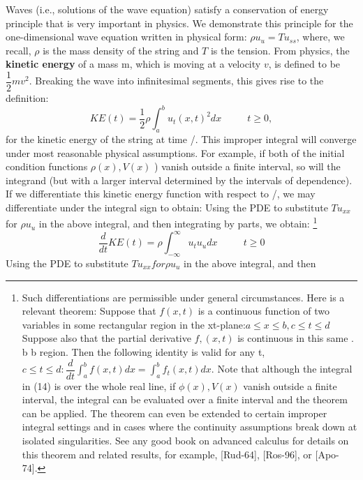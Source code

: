\documentclass[../main.tex]{subfiles}
\begin{document}
Waves (i.e., solutions of the wave equation) satisfy a conservation of energy 
principle that is very important in physics. We demonstrate this principle for the 
one-dimensional wave equation written in physical form: $\rho u_u = Tu_{ss}$, where, we recall, $ \rho $ is the mass density of the string and $T$ is the tension. From physics, the 
\textbf{kinetic energy} of a mass m, which is moving at a velocity $v$, is defined to be $\dfrac{1}{2}mv^2$. Breaking the wave into infinitesimal segments, this gives rise to the 
definition: 
\begin{equation} \label{eqa14}
KE(t)=\dfrac{1}{2} \rho \int_a^b u_t (x,t)^2 dx ~~~~~~~~~~~~ t\geq 0, 
\end{equation}
for the kinetic energy of the string at time /. This improper integral will converge 
under most reasonable physical assumptions. For example, if both of the initial 
condition functions  $ \rho (x), V(x)$ ) vanish outside a finite interval, so will the 
integrand (but with a larger interval determined by the intervals of dependence). If we differentiate this kinetic energy function with respect to /, we may differentiate 
under the integral sign to obtain: 
Using the PDE to substitute $ Tu_{xx}$for $\rho u_u$ in the above integral, and then 
integrating by parts, we obtain: 
\footnote{ Such differentiations are permissible under general circumstances. Here is a relevant theorem: 
Suppose that $f(x,t)$ is a continuous function of two variables in some rectangular region in the xt-plane:$a\leqslant x\leqslant b, c\leqslant t \leqslant d$ Suppose also that the partial derivative $f,(x,t)$ is continuous in this same 
. b b region. Then the following identity is valid for any t, $c\leqslant t \leqslant d : \dfrac{d}{dt} \int_{a}^{b} f(x,t)dx=\int_{a}^{b} f_t (x,t) dx$. Note that 
although the integral in (14) is over the whole real line, if $\phi(x), V(x)$ vanish outside a finite interval, 
the integral can be evaluated over a finite interval and the theorem can be applied. The theorem can 
even be extended to certain improper integral settings and in cases where the continuity assumptions 
break down at isolated singularities. See any good book on advanced calculus for details on this 
theorem and related results, for example, [Rud-64], [Ros-96], or [Apo-74]. } 
\begin{equation}\label{eqa15}
\frac{d}{dt} KE(t)=\rho \int_{-\infty}^{\infty} u_t u_u dx ~~~~~~~~~~~~ t\geq 0
\end{equation}
Using the PDE to substitute $Tu_{xx} for \rho u_u$ in the above integral, and then 
\end{document}
